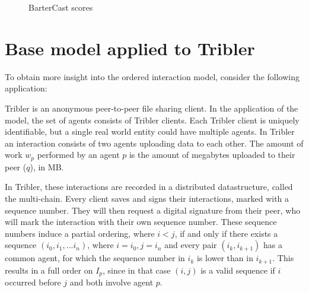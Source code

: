 \documentclass[a4paper,11pt]{book}
\theoremstyle{definition}
\begin{document}
 \begin{figure}[b]
        \centering
         \caption{BarterCast scores}
     \end{figure}

\section{Base model applied to Tribler}

To obtain more insight into the ordered interaction model, consider the following application:

Tribler is an anonymous peer-to-peer file sharing client. In the application of the model,
the set of agents consists of Tribler clients. Each Tribler client is uniquely identifiable,
but a single real world entity could have multiple agents. In Tribler an interaction
consists of two agents uploading data to each other. The amount of work $w_p$ performed
by an agent $p$ is the amount of megabytes uploaded to their peer ($q$), in MB.

In Tribler, these interactions are recorded in a distributed datastructure, called the multi-chain.
Every client saves and signs their interactions, marked with a sequence number. They will then request
a digital signature from their peer, who will mark the interaction with their own sequence number.
These sequence numbers induce a partial ordering, where $i < j$, if and only if there exists
a sequence $(i_0, i_1, \ldots i_n)$, where $i=i_0, j=i_n$ and every pair $(i_k, i_{k+1})$ has
a common agent, for which the sequence number in $i_k$ is lower than in $i_{k+1}$.
This results in a full order on $I_p$, since in that case $(i, j)$ is a valid sequence if
$i$ occurred before $j$ and both involve agent $p$.
\end{document}
